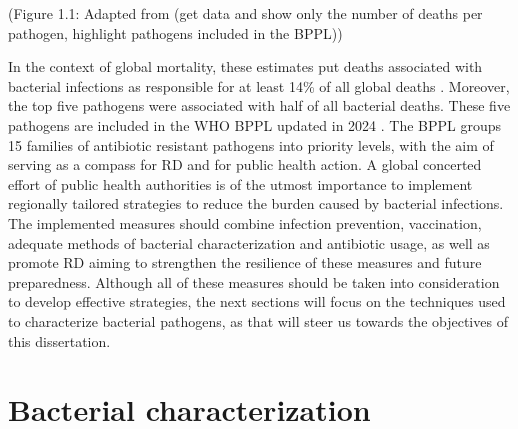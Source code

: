 (Figure 1.1: Adapted from \cite{ikuta_global_2022} (get data and show only the number of deaths per pathogen, highlight pathogens included in the \ac{BPPL}))

In the context of global mortality, these estimates put deaths associated with bacterial infections as responsible for at least 14\% of all global deaths \cite{ikuta_global_2022}. Moreover, the top five pathogens were associated with half of all bacterial deaths. These five pathogens are included in the \ac{WHO} \ac{BPPL} updated in 2024 \cite{noauthor_who_2024}. The \ac{BPPL} groups 15 families of antibiotic resistant pathogens into priority levels, with the aim of serving as a compass for \ac{RD} and for public health action. A global concerted effort of public health authorities is of the utmost importance to implement regionally tailored strategies to reduce the burden caused by bacterial infections. The implemented measures should combine infection prevention, vaccination, adequate methods of bacterial characterization and antibiotic usage, as well as promote \ac{RD} aiming to strengthen the resilience of these measures and future preparedness. Although all of these measures should be taken into consideration to develop effective strategies, the next sections will focus on the techniques used to characterize bacterial pathogens, as that will steer us towards the objectives of this dissertation.

\section{Bacterial characterization}

